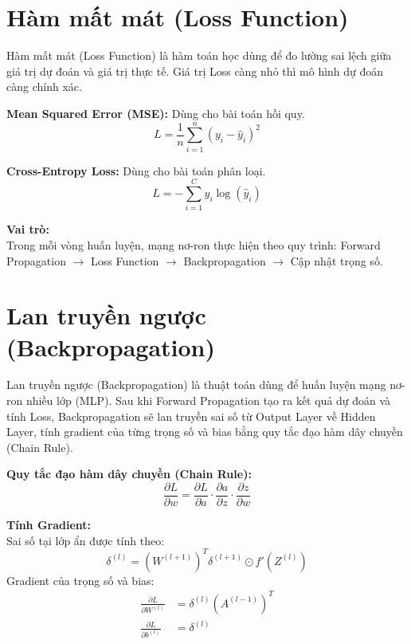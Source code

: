 \documentclass[12pt,a4paper]{report}
\begin{document}
\section{Hàm mất mát (Loss Function)}
Hàm mất mát (Loss Function) là hàm toán học dùng để đo lường sai lệch giữa giá trị dự đoán và giá trị thực tế. Giá trị Loss càng nhỏ thì mô hình dự đoán càng chính xác. 

\textbf{Mean Squared Error (MSE):} Dùng cho bài toán hồi quy.
\begin{equation}
    L = \frac{1}{n} \sum_{i=1}^n (y_i - \hat{y}_i)^2
\end{equation}

\textbf{Cross-Entropy Loss:} Dùng cho bài toán phân loại.
\begin{equation}
    L = - \sum_{i=1}^C y_i \log(\hat{y}_i)
\end{equation}

\textbf{Vai trò:} \\
Trong mỗi vòng huấn luyện, mạng nơ-ron thực hiện theo quy trình: Forward Propagation $\rightarrow$ Loss Function $\rightarrow$ Backpropagation $\rightarrow$ Cập nhật trọng số.

\section{Lan truyền ngược (Backpropagation)}
Lan truyền ngược (Backpropagation) là thuật toán dùng để huấn luyện mạng nơ-ron nhiều lớp (MLP). Sau khi Forward Propagation tạo ra kết quả dự đoán và tính Loss, Backpropagation sẽ lan truyền sai số từ Output Layer về Hidden Layer, tính gradient của từng trọng số và bias bằng quy tắc đạo hàm dây chuyền (Chain Rule).

\textbf{Quy tắc đạo hàm dây chuyền (Chain Rule):}
\begin{equation}
    \frac{\partial L}{\partial w} = \frac{\partial L}{\partial a} \cdot \frac{\partial a}{\partial z} \cdot \frac{\partial z}{\partial w}
\end{equation}

\textbf{Tính Gradient:} \\
Sai số tại lớp ẩn được tính theo:
\begin{equation}
    \delta^{(l)} = (W^{(l+1)})^T \delta^{(l+1)} \odot f'(Z^{(l)})
\end{equation}
Gradient của trọng số và bias:
\begin{align}
    \frac{\partial L}{\partial W^{(l)}} &= \delta^{(l)} (A^{(l-1)})^T \\
    \frac{\partial L}{\partial b^{(l)}} &= \delta^{(l)}
\end{align}
\end{document}
